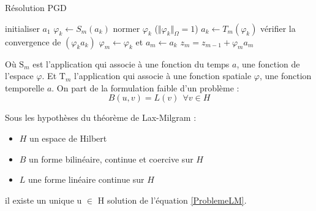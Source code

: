 \documentclass[12pt,a4paper]{report}
\begin{document}

\begin{algorithm}
\caption{Résolution PGD}
\begin{algorithmic}[1]
\STATE initialiser $a_1$
\STATE $\varphi_k \leftarrow S_m(a_k )$
\STATE normer $\varphi_k$ ($\Vert\varphi_k\Vert_\Omega = 1$)
\STATE $a_k \leftarrow T_m (\varphi_k )$
\STATE vérifier la convergence de $(\varphi_k a_k)$
\ENDFOR
\STATE $\varphi_m \leftarrow \varphi_k$ et $a_m \leftarrow a_k$
\STATE $z_m = z_{m-1} + \varphi_m a_m$
\ENDFOR
\end{algorithmic}
\label{AlgoPGD}
\end{algorithm}
\label{AlgoPGDPartie}


Où $\text{S}_m$ est l'application qui associe à une fonction du temps $a$, une fonction de l'espace $\varphi$. Et $\text{T}_m$ l'application qui associe à une fonction spatiale $\varphi$, une fonction temporelle $a$. On part de la formulation faible d'un problème :
\begin{equation}
\label{ProblemeLM}
B(u,v) = L(v) ~~ \forall v \in H
\end{equation}

\label{LaxMilgram}
\noindent
Sous les hypothèses du théorème de Lax-Milgram :
\begin{itemize}
\item $H$ un espace de Hilbert
\item $B$ un forme bilinéaire, continue et coercive sur $H$
\item $L$ une forme linéaire continue sur $H$
\end{itemize}
il existe un unique u $\in$ H solution de l'équation \ref{ProblemeLM}.
\end{document}
